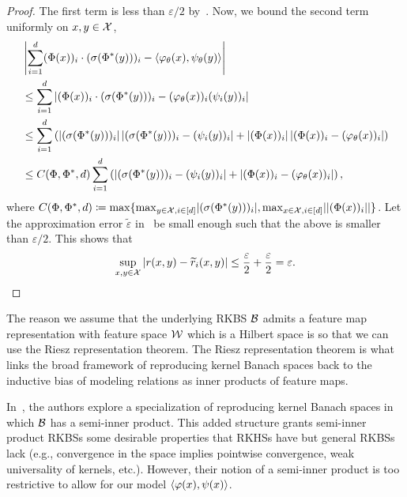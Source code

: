 \begin{proof}
    The first term is less than $\varepsilon / 2$ by~. Now, we bound the second term uniformly on $x,y \in {\mathcal{X}}$,
    \begin{align*}
        &\abs{\sum_{i=1}^{d} (\Phi(x))_i \cdot (\sigma(\Phi^*(y)))_i - \iprod{\phi_\theta(x)}{\psi_\theta(y)}} \\
        &\leq \sum_{i=1}^{d} \abs{(\Phi(x))_i \cdot (\sigma(\Phi^*(y)))_i - (\phi_\theta(x))_i(\psi_i(y))_i} \\
        &\leq \sum_{i=1}^{d} \paren{\abs{(\sigma(\Phi^*(y)))_i} \abs{(\sigma(\Phi^*(y)))_i - (\psi_i(y))_i} + \abs{(\Phi(x))_i} \abs{(\Phi(x))_i - (\phi_\theta(x))_i}}\\
        &\leq C(\Phi, \Phi^*, d) \sum_{i=1}^{d} \paren{\abs{(\sigma(\Phi^*(y)))_i - (\psi_i(y))_i} + \abs{(\Phi(x))_i - (\phi_\theta(x))_i}},
    \end{align*}
    where $C(\Phi, \Phi^*, d) \coloneq \max\{\max_{y \in {\mathcal{X}}, i \in [d]} \lvert(\sigma(\Phi^*(y)))_i\rvert, \max_{x \in {\mathcal{X}}, i \in [d]} \lvert\left\lvert(\Phi(x))_i\right\rvert\rvert\}$. Let the approximation error $\tilde{\varepsilon}$ in~ be small enough such that the above is smaller than $\varepsilon / 2$. This shows that
    \begin{equation*}
        \sup_{x,y \in \calX} \abs{r(x,y) - \tilde{r}_i(x,y)} \leq \frac{\varepsilon}{2} + \frac{\varepsilon}{2} = \varepsilon.
    \end{equation*}
\end{proof}

\begin{remark}
    The reason we assume that the underlying RKBS ${\mathcal{B}}$ admits a feature map representation with feature space ${\mathcal{W}}$ which is a Hilbert space is so that we can use the Riesz representation theorem. The Riesz representation theorem is what links the broad framework of reproducing kernel Banach spaces back to the inductive bias of modeling relations as inner products of feature maps.
\end{remark}

\begin{remark}
    In~\parencite{zhangReproducingKernel2009}, the authors explore a specialization of reproducing kernel Banach spaces in which ${\mathcal{B}}$ has a semi-inner product. This added structure grants semi-inner product RKBSs some desirable properties that RKHSs have but general RKBSs lack (e.g., convergence in the space implies pointwise convergence, weak universality of kernels, etc.). However, their notion of a semi-inner product is too restrictive to allow for our model $\left \langle \varphi(x), \psi(x) \right\rangle$.
\end{remark}
